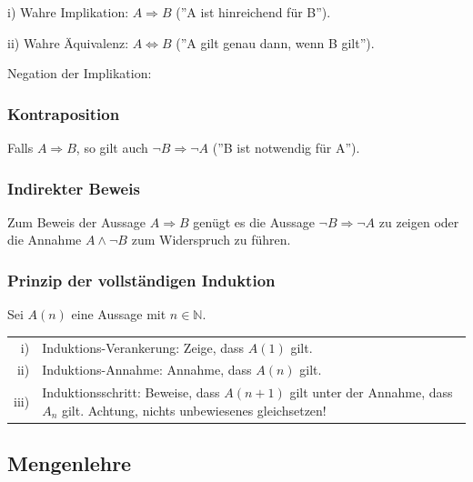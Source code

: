\documentclass[a4paper, fontsize = 8pt, landscape]{scrartcl}
\newcommand{\eqbox}[1]{\fcolorbox{black}{white}{\hspace{0.5em}#1\hspace{0.5em}}}
\newcommand{\N}[0]{\mathbb{N}}
\begin{document}
\begin{multicols*}{3}
    i) Wahre Implikation: $A \Rightarrow B$ (''A ist hinreichend für B'').

    ii) Wahre Äquivalenz: $A \Leftrightarrow B$ (''A gilt genau dann, wenn B gilt'').

    \begin{center}
        Negation der Implikation: \quad \eqbox{$\neg(A \rightarrow B) \Leftrightarrow A \land \neg B$}
    \end{center}

    \subsubsection{Kontraposition}

    Falls $A \Rightarrow B$, so gilt auch $\neg B \Rightarrow \neg A$ (''B ist notwendig für A'').


    \subsubsection{Indirekter Beweis}

    Zum Beweis der Aussage $A \Rightarrow B$ genügt es die Aussage $\neg B \Rightarrow \neg A$ zu zeigen oder die Annahme $A \land \neg B$ zum Widerspruch zu führen.


    \subsubsection{Prinzip der vollständigen Induktion}

    Sei $A(n)$ eine Aussage mit $n \in \N$.

    \begin{tabular}{r p{}} \toprule
        i)   & \hspace*{-10pt} Induktions-Verankerung: Zeige, dass $A(1)$ gilt.                                   \\
        ii)  & \hspace*{-10pt} Induktions-Annahme: Annahme, dass $A(n)$ gilt.                                     \\
        iii) & \hspace*{-10pt} Induktionsschritt: Beweise, dass $A(n+1)$ gilt unter der Annahme, dass $A_n$ gilt.
        Achtung, nichts unbewiesenes gleichsetzen!                                                                \\ \bottomrule
    \end{tabular}


    \subsection{Mengenlehre}


\end{multicols*}
\end{document}
